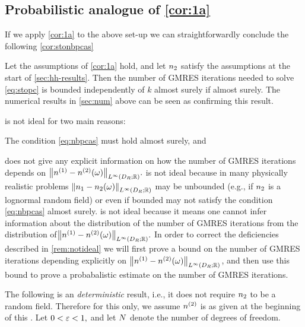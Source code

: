 \subsection{Probabilistic analogue of \cref{cor:1a}}
If we apply \cref{cor:1a} to the above set-up we can straightforwardly conclude the following \cref{cor:stonbpcas}

\label{cor:stonbpcas}
Let the assumptions of \cref{cor:1a} hold, and let $n_{2}$ satisfy the assumptions at the start of \cref{sec:hh-results}. Then the number of GMRES iterations needed to solve \cref{eq:stopc} is bounded independently of $k$ almost surely if
\beq\label{eq:nbpcas}
\NLiDRRR{\nso-\nst(\omega)} \leq {}
\eeq
almost surely.
\eco
The numerical results in \cref{sec:num} above can be seen as confirming this result.

\label{rem:notideal}
 is not ideal for two main reasons:
\ben
\item\label{it:notideal1} The condition \cref{eq:nbpcas} must hold almost surely, and
  \item\label{it:notideal2}  does not give any explicit information on how the number of GMRES iterations depends on $\NLiDRRR{\nso-\nst(\omega)}.$
    \een
     is not ideal because in many physically realistic problems $\NLiDRRR{\no-\nt(\omega)}$ may be unbounded (e.g., if $n_{2}$ is a lognormal random field) or even if bounded may not satisfy the condition \cref{eq:nbpcas} almost surely.  is not ideal because it means one cannot infer information about the distribution of the number of GMRES iterations from the distribution of$\NLiDRRR{\nso-\nst(\omega)}.$
    \ere
    In order to correct the deficiencies described in \cref{rem:notideal} we will first prove a bound on the number of GMRES iterations depending explicitly on $\NLiDRRR{\nso-\nst(\omega)}$, and then use this bound to prove a probabalistic estimate on the number of GMRES iterations.

The following  is an \emph{deterministic} result, i.e., it does not require $n_{2}$ to be a random field. Therefore for this  only, we assume ${n}^{(2)}$ is as given at the beginning of this .
\label{lem:probgmres1}
Let $0 < \varepsilon < 1,$ and let $N$ denote the number of degrees of freedom.

